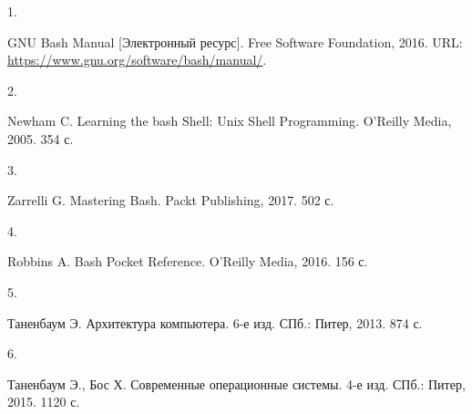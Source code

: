 \documentclass[
  12pt,
  russian,
  a4paper,
]{scrreprt}
\newlength{\cslhangindent}
\newlength{\csllabelwidth}
\newenvironment{CSLReferences}[2] %
 {%
  \setlength{\parindent}{0pt}
  \ifodd #1 \everypar{\setlength{\hangindent}{\cslhangindent}}\ignorespaces\fi
  \ifnum #2 > 0
  \setlength{\parskip}{#2\baselineskip}
  \fi
 }%
 {}
\newcommand{\CSLLeftMargin}[1]{\parbox[t]{\csllabelwidth}{#1}}
\newcommand{\CSLRightInline}[1]{\parbox[t]{\linewidth - \csllabelwidth}{#1}\break}
\begin{document}
\hypertarget{refs}{}
\begin{CSLReferences}{0}{0}
\leavevmode{}%
\CSLLeftMargin{1. }
\CSLRightInline{{GNU Bash Manual} {[}Электронный ресурс{]}. Free
Software Foundation, 2016. URL:
\url{https://www.gnu.org/software/bash/manual/}.}

\leavevmode{}%
\CSLLeftMargin{2. }
\CSLRightInline{Newham C. {Learning the bash Shell: Unix Shell
Programming}. O’Reilly Media, 2005. 354 с.}

\leavevmode{}%
\CSLLeftMargin{3. }
\CSLRightInline{Zarrelli G. {Mastering Bash}. Packt Publishing, 2017.
502 с.}

\leavevmode{}%
\CSLLeftMargin{4. }
\CSLRightInline{Robbins A. {Bash Pocket Reference}. O’Reilly Media,
2016. 156 с.}

\leavevmode{}%
\CSLLeftMargin{5. }
\CSLRightInline{Таненбаум Э. {Архитектура компьютера}. 6-е изд. СПб.:
Питер, 2013. 874 с.}

\leavevmode{}%
\CSLLeftMargin{6. }
\CSLRightInline{Таненбаум Э., Бос Х. {Современные операционные системы}.
4-е изд. СПб.: Питер, 2015. 1120 с.}

\end{CSLReferences}

\printbibliography
\end{document}
